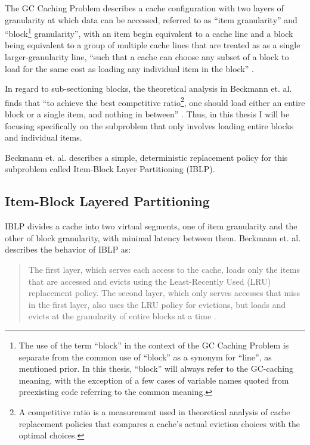 \documentclass[12pt,twoside]{reedthesis}
\begin{document}
The GC Caching Problem describes a cache configuration with two layers of granularity at which data can be accessed, referred to as ``item granularity'' and ``block\footnote{The use of the term ``block'' in the context of the GC Caching Problem is separate from the common use of ``block'' as a synonym for ``line'', as mentioned prior. In this thesis, ``block'' will always refer to the GC-caching meaning, with the exception of a few cases of variable names quoted from preexisting code referring to the common meaning.} granularity'', with an item begin equivalent to a cache line and a block being equivalent to a group of multiple cache lines that are treated as as a single larger-granularity line, ``such that a cache can choose any subset of a block to load for the same cost as loading any individual item in the block'' \cite{beckmann}.

In regard to sub-sectioning blocks, the theoretical analysis in Beckmann et. al. finds that ``to achieve the best competitive ratio\footnote{A competitive ratio is a measurement used in theoretical analysis of cache replacement policies that compares a cache's actual eviction choices with the optimal choices.}, one should load either an entire block or a single item, and nothing in between'' \cite{beckmann}. Thus, in this thesis I will be focusing specifically on the subproblem that only involves loading entire blocks and individual items.

Beckmann et. al. describes a simple, deterministic replacement policy for this subproblem called Item-Block Layer Partitioning (IBLP).

	\subsection*{Item-Block Layered Partitioning}

	IBLP divides a cache into two virtual segments, one of item granularity and the other of block granularity, with minimal latency between them. Beckmann et. al. describes the behavior of IBLP as: \begin{quote}
		The first layer, which serves each access to the cache, loads only the items that are accessed and evicts using the Least-Recently Used (LRU) replacement policy. The second layer, which only serves accesses that miss in the first layer, also uses the LRU policy for evictions, but loads and evicts at the granularity of entire blocks at a time \cite{beckmann}.
	\end{quote}
\end{document}
